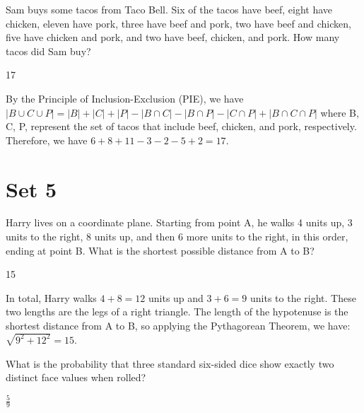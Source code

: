\documentclass[11pt]{article}
\begin{document}
\begin{problem} %
Sam buys some tacos from Taco Bell. Six of the tacos have beef, eight have chicken, eleven have pork, three have beef and pork, two have beef and chicken, five have chicken and pork, and two have beef, chicken, and pork. How many tacos did Sam buy?
\end{problem}

\begin{answer}
17
\end{answer}

\begin{solution} %
By the Principle of Inclusion-Exclusion (PIE), we have $|B \cup C \cup P| = |B| + |C| + |P| - |B \cap C| - |B \cap P| - | C \cap P| + |B \cap C \cap P|$ where B, C, P, represent the set of tacos that include beef, chicken, and pork, respectively. Therefore, we have $6+8+11-3-2-5+2=17$.
\end{solution}

\newpage

\section*{Set 5}

\begin{problem} %
Harry lives on a coordinate plane. Starting from point A, he walks 4 units up, 3 units to the right, 8 units up, and then 6 more units to the right, in this order, ending at point B. What is the shortest possible distance from A to B?
\end{problem}

\begin{answer}
15
\end{answer}

\begin{solution} %
In total, Harry walks $4+8 = 12$ units up and $3+6=9$ units to the right. These two lengths are the legs of a right triangle. The length of the hypotenuse is the shortest distance from A to B, so applying the Pythagorean Theorem, we have: $\sqrt{9^2+12^2} = 15$.
\end{solution}


\begin{problem}%
What is the probability that three standard six-sided dice  show exactly two distinct face values when rolled?
\end{problem}

\begin{answer}
$\frac{5}{9}$
\end{answer}
\end{document}
